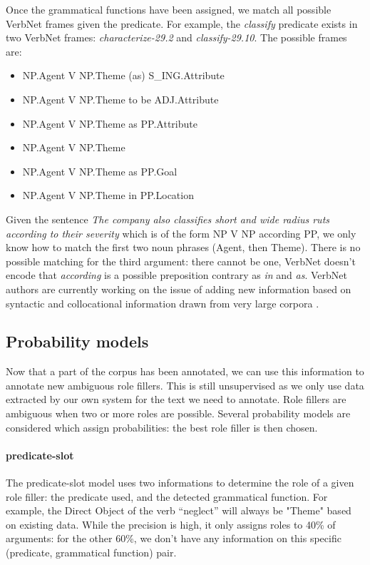 Once the grammatical functions have been assigned, we match all possible
VerbNet frames given the predicate. For example, the \textit{classify}
predicate exists in two VerbNet frames: \textit{characterize-29.2} and
\textit{classify-29.10}. The possible frames are:

\begin{itemize}
    \item NP.Agent V NP.Theme (as) S\_ING.Attribute
    \item NP.Agent V NP.Theme to be ADJ.Attribute
    \item NP.Agent V NP.Theme as PP.Attribute
    \item NP.Agent V NP.Theme
    \item NP.Agent V NP.Theme as PP.Goal
    \item NP.Agent V NP.Theme in PP.Location
\end{itemize}

Given the sentence \emph{The company also classifies short and wide radius
ruts according to their severity} which is of the form NP V NP according PP, we
only know how to match the first two noun phrases (Agent, then Theme). There is
no possible matching for the third argument: there cannot be one, VerbNet
doesn't encode that \emph{according} is a possible preposition contrary as \emph{in}
and \emph{as}. VerbNet authors are currently working on the issue of adding new
information based on syntactic and collocational information drawn from very
large corpora \citep{bonial2013expanding}.

\subsection{Probability models}

Now that a part of the corpus has been annotated, we can use this information
to annotate new ambiguous role fillers. This is still unsupervised as we only
use data extracted by our own system for the text we need to annotate. Role
fillers are ambiguous when two or more roles are possible. Several probability
models are considered which assign probabilities: the best role filler is then
chosen.

\paragraph{predicate-slot}

The predicate-slot model uses two informations to determine the role of a given
role filler: the predicate used, and the detected grammatical function.  For
example, the Direct Object of the verb ``neglect'' will always be "Theme" based
on existing data. While the precision is high, it only assigns roles to 40\% of
arguments: for the other 60\%, we don't have any information on this specific
(predicate, grammatical function) pair.

